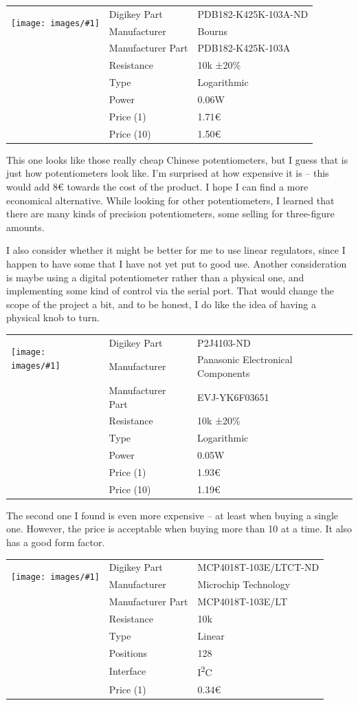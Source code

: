 \documentclass[a4paper]{article}
\makeatletter
\newenvironment{partdisplay}[1]{
\begin{center}
\begin{tabular}{@{}p{3cm}p{3cm}p{4.5cm}@{}}
\multirow{2}{3cm}{\texttt{[image: images/\#1]}}}{
\end{tabular}
\end{center}}
\makeatother
\begin{document}
\begin{partdisplay}{PDB182}
& Digikey Part & PDB182-K425K-103A-ND\\
& Manufacturer & Bourns\\
& Manufacturer Part & PDB182-K425K-103A\\
& Resistance & 10k ±20\%\\
& Type & Logarithmic\\
& Power & 0.06W\\
& Price (1) & 1.71€\\
& Price (10) & 1.50€\\
\end{partdisplay}

This one looks like those really cheap Chinese potentiometers, but I guess that is just how potentiometers look like. I'm surprised at how expensive it is -- this would add 8€ towards the cost of the product. I hope I can find a more economical alternative. While looking for other potentiometers, I learned that there are many kinds of precision potentiometers, some selling for three-figure amounts.

I also consider whether it might be better for me to use linear regulators, since I happen to have some that I have not yet put to good use. Another consideration is maybe using a digital potentiometer rather than a physical one, and implementing some kind of control via the serial port. That would change the scope of the project a bit, and to be honest, I do like the idea of having a physical knob to turn. 

\begin{partdisplay}{EVJY}
& Digikey Part & P2J4103-ND\\
& Manufacturer & Panasonic Electronical Components\\
& Manufacturer Part & EVJ-YK6F03651\\
& Resistance & 10k ±20\%\\
& Type & Logarithmic\\
& Power & 0.05W\\
& Price (1) & 1.93€\\
& Price (10) & 1.19€\\
\end{partdisplay}

The second one I found is even more expensive -- at least when buying a single one. However, the price is acceptable when buying more than 10 at a time. It also has a good form factor.

\begin{partdisplay}{soic6}
& Digikey Part & MCP4018T-103E/LTCT-ND\\
& Manufacturer & Microchip Technology\\
& Manufacturer Part & MCP4018T-103E/LT\\
& Resistance & 10k\\
& Type & Linear\\
& Positions & 128\\
& Interface & I\textsuperscript{2}C\\
& Price (1) & 0.34€\\  
\end{partdisplay}
\end{document}
